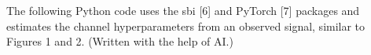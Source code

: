 \documentclass{article}
\begin{document}







The following Python code uses the sbi [6] and PyTorch [7] packages and estimates the channel hyperparameters from an observed signal, similar to Figures 1 and 2. (Written with the help of AI.)
\end{document}
